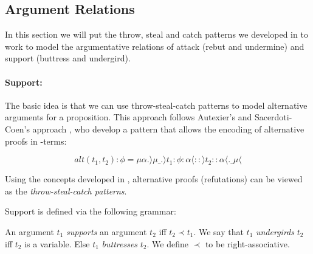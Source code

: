 \documentclass{IOS-Book-Article}
\begin{document}
\subsection{Argument Relations}

In this section we will put the throw, steal and catch patterns we developed in  to work to model the argumentative relations of attack (rebut and undermine) and support (buttress and undergird).

\paragraph{Support:} The basic idea is that we can use throw-steal-catch patterns to model alternative arguments for a proposition.
This approach follows Autexier's and Sacerdoti-Coen's approach \cite{AutexierSacerdotiCoen2006OMDocLambdaMuMu}, who develop a pattern that allows the encoding of alternative proofs in \matilda-terms:

\[alt(t_1,t_2):\phi = \mu \alpha.\rangle \mu\_.\rangle t_1 :\phi: \alpha \langle :: \rangle t_2 :: \alpha \langle.\_\mu\langle\]

Using the concepts developed in , alternative proofs (refutations) can be viewed as the \emph{throw-steal-catch patterns}.




\begin{definition}[Support]
  Support is defined via the following grammar:
  
  \begin{grammar}
\end{grammar}

  An argument $t_1$ \emph{supports} an argument $t_2$ iff $t_2\prec t_1$. We say that $t_1$ \emph{undergirds} $t_2$ iff $t_2$ is a variable. Else $t_1$ \emph{buttresses} $t_2$. We define $\prec$ to be right-associative.
\end{definition}
\end{document}
